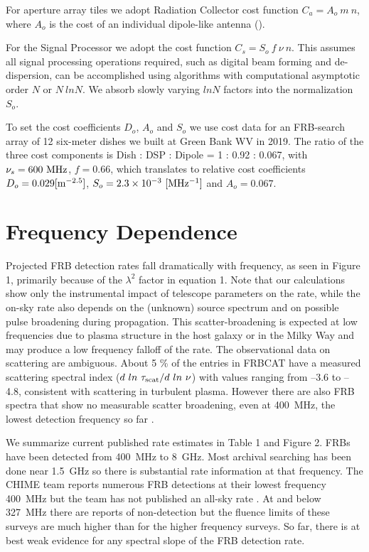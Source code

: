 \documentclass[fleqn,usenatbib]{mnras}
\begin{document}
For aperture array tiles we adopt Radiation Collector cost function $C_a = A_o ~m ~n$, where $A_o$ is the cost of an individual dipole-like antenna (\cite{clover}).

For the Signal Processor we adopt the cost function $C_s = S_o ~f ~\nu ~n$.  This assumes all signal processing operations required, such as digital beam forming and de-dispersion, can be accomplished using algorithms with computational asymptotic order $N$ or $N ~ln N$.  We absorb slowly varying $ln N$ factors into the normalization $S_o$.

To set the cost coefficients $D_o$, $A_o$ and $S_o$ we use cost data for an FRB-search array of 12 six-meter dishes we built at Green Bank WV in 2019.   The ratio of the three cost components is Dish : DSP : Dipole  = 1 : 0.92 : 0.067,  with $\nu_s=600\rm{~MHz}$, $f= 0.66$, which translates to relative cost coefficients 
$D_o= 0.029 [\rm{m^{-2.5}}]$, $ S_o = 2.3 \times 10^{-3}\rm{~[MHz^{-1}}]$ and $A_o = 0.067$. 


\section{Frequency Dependence}

Projected FRB detection rates fall dramatically with frequency, as seen in Figure 1, primarily because of the $\lambda^2$ factor in equation 1.
Note that our calculations show only the instrumental impact of telescope parameters on the rate, while the on-sky rate also depends on the (unknown) source spectrum and on possible pulse broadening during propagation. This scatter-broadening is expected at low frequencies due to plasma structure in the host galaxy or in the Milky Way and may produce a low frequency falloff of the rate. The observational data on scattering are ambiguous. About 5 \% of the entries in FRBCAT \citep{frbcat}  have a measured scattering spectral index ($d ~ln ~\tau_{\rm{scat}}/ d ~ln ~\nu$) with values ranging from --3.6 to --4.8, consistent with scattering in turbulent plasma. However there are also FRB spectra that show no measurable scatter broadening, even at 400~MHz, the lowest detection frequency so far \citep{chime1}. 

We summarize current published rate estimates in Table 1 and Figure 2. FRBs have been detected from 400~MHz to 8~GHz. Most archival searching has been done near 1.5~GHz so there is substantial rate information at that frequency. The CHIME team reports numerous FRB detections at their lowest frequency 400~MHz but the team has not published an all-sky rate \citep{chimesystem, chime1, chime2}. At and below 327~MHz there are reports of non-detection but the fluence limits of these surveys are much higher than for the higher frequency surveys. So far, there is at best weak evidence for any spectral slope of the FRB detection rate.
\end{document}
